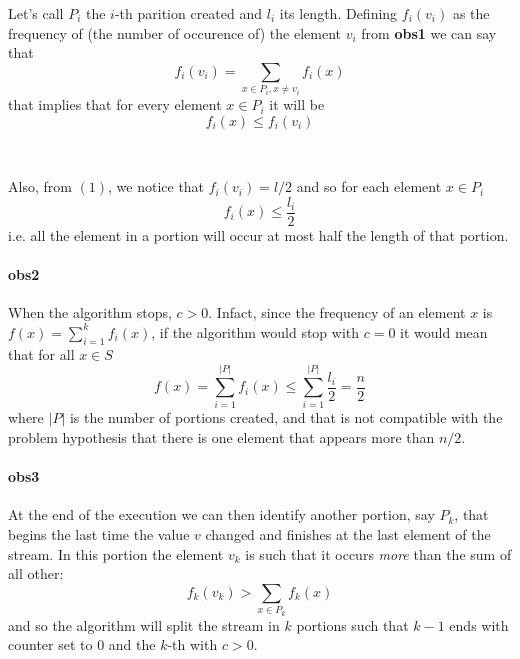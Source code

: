 \documentclass[a4paper]{article}
\begin{document}
\noindent 
Let's call $P_i$ the $i$-th parition created and $l_i$ its length. Defining $f_i(v_i)$ as the frequency of (the number of occurence of) the element $v_i$ from \textbf{obs1} we can say that 
\begin{equation}
f_i(v_i) = \sum_{x \in P_i, x \neq v_i} f_i(x)
\end{equation}
that implies that for every element $x \in P_i$ it will be
\begin{equation}
f_i(x) \leq f_i(v_i)
\end{equation}

\

\noindent
Also, from $(1)$, we notice that $f_i(v_i) = l/2$ and so for each element $x \in P_i$
\begin{equation}
f_i(x) \leq  \frac{l_i}{2}%
\end{equation}
i.e. all the element in a portion will occur at most half the length of that portion.

\paragraph{obs2} When the algorithm stops, $c>0$.
Infact, since the frequency of an element $x$ is $f(x) = \sum_{i=1}^k f_i(x)$,  if the algorithm would stop with $c=0$ it would mean that for all $x \in S$
\begin{displaymath}
f(x) = \sum_{i=1}^{|P|} f_i(x) \leq \sum_{i=1}^{|P|} \frac{l_i}{2} = \frac{n}{2} 
\end{displaymath}
where $|P|$ is the number of portions created, and that is not compatible with the problem hypothesis that there is one element that appears more than $n/2$.


\paragraph{obs3} 
At the end of the execution we can then identify another portion, say $P_k$, that begins the last time the value $v$ changed and finishes at the last element of the stream.
In this portion the element $v_k$ is such that it occurs \emph{more} than the sum of all other:
\begin{equation}
f_k(v_k) > \sum_{x \in P_k} f_k(x)
\end{equation}
and so the algorithm will split the stream in $k$ portions such that $k-1$ ends with counter set to $0$ and the $k$-th with $c > 0$.

\
\end{document}
